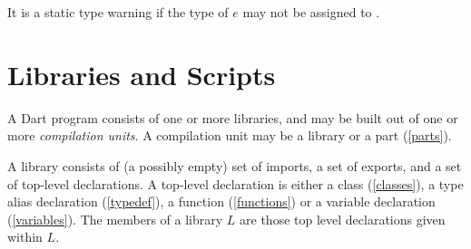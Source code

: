 \documentclass{article}
\begin{document}
\LMHash{}
It is a static type warning if the type of $e$ may not be assigned to .









\section{Libraries and Scripts}

\LMHash{}
A Dart program consists of one or more libraries, and may be built out of one or more {\em compilation units}.
A compilation unit may be a library or a part (\ref{parts}).

\LMHash{}
A library consists of (a possibly empty) set of imports, a set of exports, and a set of top-level declarations.
A top-level declaration is either a class (\ref{classes}), a type alias declaration (\ref{typedef}), a function (\ref{functions}) or a variable declaration (\ref{variables}).
The members of a library $L$ are those top level declarations given within $L$.
\end{document}
